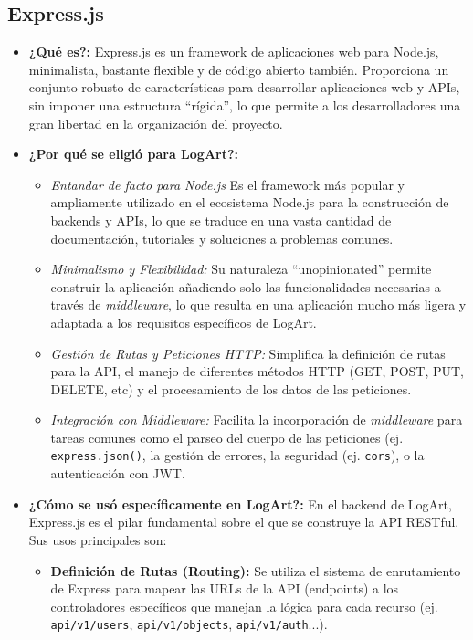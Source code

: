 \subsection{Express.js}
\label{sec:expressjs}

\begin{itemize}
    \item \textbf{¿Qué es?:} Express.js es un framework de aplicaciones web para Node.js, minimalista, bastante flexible y de código abierto también. Proporciona un conjunto robusto de características para desarrollar aplicaciones web y APIs, sin imponer una estructura ``rígida'', lo que permite a los desarrolladores una gran libertad en la organización del proyecto. \cite{kinstaQueEsExpress}
    \item \textbf{¿Por qué se eligió para LogArt?:}
        \begin{itemize}
            \item \textit{Entandar de facto para Node.js} Es el framework más popular y ampliamente utilizado en el ecosistema Node.js para la construcción de backends y APIs, lo que se traduce en una vasta cantidad de documentación, tutoriales y soluciones a problemas comunes.
            \item \textit{Minimalismo y Flexibilidad:} Su naturaleza ``unopinionated'' permite construir la aplicación añadiendo solo las funcionalidades necesarias a través de \textit{middleware}, lo que resulta en una aplicación mucho más ligera y adaptada a los requisitos específicos de LogArt.
            \item \textit{Gestión de Rutas y Peticiones HTTP:} Simplifica la definición de rutas para la API, el manejo de diferentes métodos HTTP (GET, POST, PUT, DELETE, etc) y el procesamiento de los datos de las peticiones.
            \item \textit{Integración con Middleware:} Facilita la incorporación de \textit{middleware} para tareas comunes como el parseo del cuerpo de las peticiones (ej. \texttt{express.json()}, la gestión de errores, la seguridad (ej. \texttt{cors}), o la autenticación con JWT.
        \end{itemize}
    \item \textbf{¿Cómo se usó específicamente en LogArt?:}
    En el backend de LogArt, Express.js es el pilar fundamental sobre el que se construye la API RESTful. Sus usos principales son:
        \begin{itemize}
            \item \textbf{Definición de Rutas (Routing):} Se utiliza el sistema de enrutamiento de Express para mapear las URLs de la API (endpoints) a los controladores específicos que manejan la lógica para cada recurso (ej. \texttt{api/v1/users}, \texttt{api/v1/objects}, \texttt{api/v1/auth}...).

\end{itemize}
\end{itemize}
